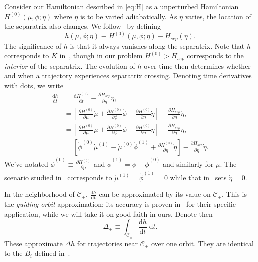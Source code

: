 \documentclass[
        fleqn,
        usenatbib,
    ]{mnras}
\newcommand*{\rd}[2]{\frac{\mathrm{d}#1}{\mathrm{d}#2}}
\newcommand*{\pd}[2]{\frac{\partial#1}{\partial#2}}
\newcommand*{\s}[1]{\left[#1\right]}
\begin{document}
Consider our Hamiltonian described in \autoref{eq:H} as a unperturbed
Hamiltonian $H^{(0)}(\mu, \phi; \eta)$ where $\eta$ is to be varied
adiabatically. As $\eta$ varies, the location of the separatrix also changes. We
follow~\cite{henrard1982} by defining
\begin{equation}
    h(\mu, \phi; \eta) \equiv H^{(0)}(\mu, \phi; \eta) - H_{sep}(\eta).
\end{equation}
The significance of $h$ is that it always vanishes along the separatrix. Note
that $h$ corresponds to $K$ in~\cite{henrard1982}, though in our problem
$H^{(0)} > H_{sep}$ corresponds to the \emph{interior} of the separatrix. The
evolution of $h$ over time then determines whether and when a trajectory
experiences separatrix crossing. Denoting time derivatives with dots, we write
\begin{align}
    \rd{h}{t} &= \rd{H^{(0)}}{t} - \pd{H_{sep}}{\eta}\dot{\eta},\nonumber\\
        &= \s{\pd{H^{(0)}}{\mu}\dot{\mu}
                + \pd{H^{(0)}}{\phi}\dot{\phi}
                + \pd{H^{(0)}}{\eta}\dot{\eta}}
            - \pd{H_{sep}}{\eta}\dot{\eta},\nonumber\\
        &= \s{\pd{H^{(0)}}{\mu}\dot{\mu}
                + \pd{H^{(0)}}{\phi}\dot{\phi}
                + \pd{H^{(0)}}{\eta}\dot{\eta}}
            - \pd{H_{sep}}{\eta}\dot{\eta},\nonumber\\
        &= \s{\dot{\phi}^{(0)}\dot{\mu}^{(1)}
                - \dot{\mu}^{(0)}\dot{\phi}^{(1)}
                + \pd{H^{(0)}}{\eta}\dot{\eta}} -
            \pd{H_{sep}}{\eta}\dot{\eta}.\label{eq:dhdt}
\end{align}
We've notated $\dot{\phi}^{(0)} \equiv \pd{H^{(0)}}{\mu}$ and $\dot{\phi}^{(1)}
= \dot{\phi} - \dot{\phi}^{(0)}$ and similarly for $\mu$. The scenario studied
in~\cite{henrard1982} corresponds to $\dot{\mu}^{(1)} = \dot{\phi}^{(1)} = 0$
while that in~\cite{g_and_h} sets $\dot{\eta} = 0$.

In the neighborhood of $\mathcal{C}_{\pm}$, $\rd{h}{t}$ can be
approximated by its value on $\mathcal{C}_{\pm}$. This is the \emph{guiding
orbit} approximation; its accuracy is proven in~\cite{henrard1982} for their
specific application, while we will take it on good faith in ours. Denote then
\begin{equation}
    \Delta_{\pm} \equiv \int_{\mathcal{C}_{\pm}} \rd{h}{t}\;\mathrm{d}t.
        \label{eq:delta}
\end{equation}
These approximate $\Delta h$ for trajectories near $\mathcal{C}_{\pm}$ over one
orbit. They are identical to the $B_i$ defined in~\cite{henrard1982}.
\end{document}
